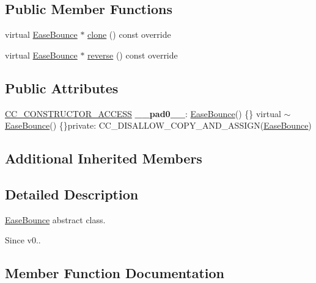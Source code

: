 \subsection*{Public Member Functions}
\begin{DoxyCompactItemize}
\item 
virtual \hyperlink{classEaseBounce}{Ease\+Bounce} $\ast$ \hyperlink{classEaseBounce_a3a39e9fa829cc40be5f2114787a98db6}{clone} () const override
\item 
virtual \hyperlink{classEaseBounce}{Ease\+Bounce} $\ast$ \hyperlink{classEaseBounce_abbd0a4bae312fa781f226cad16222773}{reverse} () const override
\end{DoxyCompactItemize}
\subsection*{Public Attributes}
\begin{DoxyCompactItemize}
\item 
\mbox{\label{classEaseBounce_afff4cd6a9d942a5dfccaf5e5b77add03}} 
\hyperlink{_2cocos2d_2cocos_2base_2ccConfig_8h_a25ef1314f97c35a2ed3d029b0ead6da0}{C\+C\+\_\+\+C\+O\+N\+S\+T\+R\+U\+C\+T\+O\+R\+\_\+\+A\+C\+C\+E\+SS} {\bfseries \+\_\+\+\_\+pad0\+\_\+\+\_\+}\+: \hyperlink{classEaseBounce}{Ease\+Bounce}() \{\} virtual $\sim$\hyperlink{classEaseBounce}{Ease\+Bounce}() \{\}private\+: C\+C\+\_\+\+D\+I\+S\+A\+L\+L\+O\+W\+\_\+\+C\+O\+P\+Y\+\_\+\+A\+N\+D\+\_\+\+A\+S\+S\+I\+GN(\hyperlink{classEaseBounce}{Ease\+Bounce})
\end{DoxyCompactItemize}
\subsection*{Additional Inherited Members}


\subsection{Detailed Description}
\hyperlink{classEaseBounce}{Ease\+Bounce} abstract class. 

\begin{DoxySince}{Since}
v0.. 
\end{DoxySince}


\subsection{Member Function Documentation}
\mbox{\label{classEaseBounce_a3a39e9fa829cc40be5f2114787a98db6}} 

